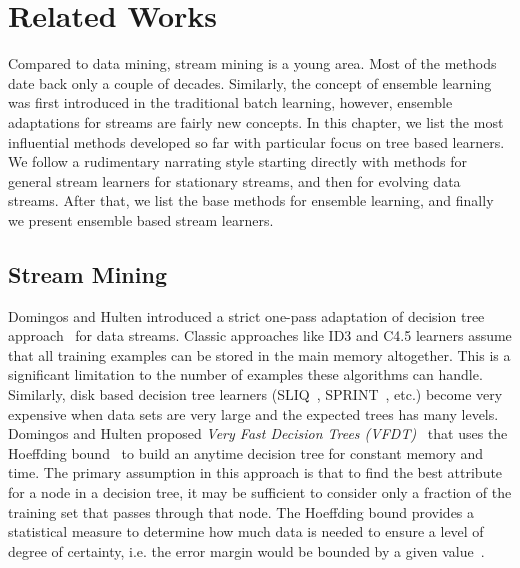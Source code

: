 \section{Related Works}
\label{chp:relworks}
Compared to data mining, stream mining is a young area. Most of the methods date back only a couple of decades. Similarly, the concept of ensemble learning was first introduced in the traditional batch learning, however, ensemble adaptations for streams are fairly new concepts. In this chapter, we list the most influential methods developed so far with particular focus on tree based learners. We follow a rudimentary narrating style starting directly with methods for general stream learners for stationary streams, and then for evolving data streams. After that, we list the base methods for ensemble learning, and finally we present ensemble based stream learners.

\subsection{Stream Mining}

Domingos and Hulten introduced a strict one-pass adaptation of decision tree approach~\cite{breiman84:dt,quinlan93:c45} for data streams. Classic approaches like ID3 and C4.5 learners assume that all training examples can be stored in the main memory altogether. This is a significant limitation to the number of examples these algorithms can handle. Similarly, disk based decision tree learners (SLIQ~\cite{mehta96:sliq}, SPRINT~\cite{shafer96:sprint}, etc.) become very expensive when data sets are very large and the expected trees has many levels. Domingos and Hulten proposed \textit{Very Fast Decision Trees (VFDT)}~\cite{domingos00:vfdt} that uses the Hoeffding bound~\cite{hoeffding63:bound} to build an anytime decision tree for constant memory and time. The primary assumption in this approach is that to find the best attribute for a node in a decision tree, it may be sufficient to consider only a fraction of the training set that passes through that node. The Hoeffding bound provides a statistical measure to determine how much data is needed to ensure a level of degree of certainty, i.e. the error margin would be bounded by a given value~\cite{catlett91:thesis}.


